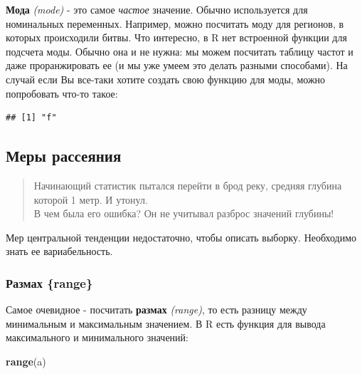 \documentclass[]{book}
\newenvironment{Shaded}{\begin{snugshade}}{\end{snugshade}}
\newcommand{\KeywordTok}[1]{\textcolor[rgb]{0.13,0.29,0.53}{\textbf{#1}}}
\newcommand{\StringTok}[1]{\textcolor[rgb]{0.31,0.60,0.02}{#1}}
\newcommand{\ControlFlowTok}[1]{\textcolor[rgb]{0.13,0.29,0.53}{\textbf{#1}}}
\newcommand{\OperatorTok}[1]{\textcolor[rgb]{0.81,0.36,0.00}{\textbf{#1}}}
\newcommand{\NormalTok}[1]{#1}
\begin{document}
\textbf{Мода} \emph{(mode)} - это самое \emph{частое} значение. Обычно
используется для номинальных переменных. Например, можно посчитать моду
для регионов, в которых происходили битвы. Что интересно, в R нет
встроенной функции для подсчета моды. Обычно она и не нужна: мы можем
посчитать таблицу частот и даже проранжировать ее (и мы уже умеем это
делать разными способами). На случай если Вы все-таки хотите создать
свою функцию для моды, можно попробовать что-то такое:

\begin{Shaded}
\end{Shaded}

\begin{verbatim}
## [1] "f"
\end{verbatim}

\subsection{Меры рассеяния}\label{vary}

\begin{quote}
Начинающий статистик пытался перейти в брод реку, средняя глубина
которой 1 метр. И утонул.\\
В чем была его ошибка? Он не учитывал разброс значений глубины!
\end{quote}

Мер центральной тенденции недостаточно, чтобы описать выборку.
Необходимо знать ее вариабельность.

\subsubsection{Размах
\{range\}}\label{ux440ux430ux437ux43cux430ux445-range}

Самое очевидное - посчитать \textbf{размах} \emph{(range)}, то есть
разницу между минимальным и максимальным значением. В R есть функция для
вывода максимального и минимального значений:

\begin{Shaded}
\begin{Highlighting}[]
\KeywordTok{range}\NormalTok{(a)}
\end{Highlighting}
\end{Shaded}
\end{document}
